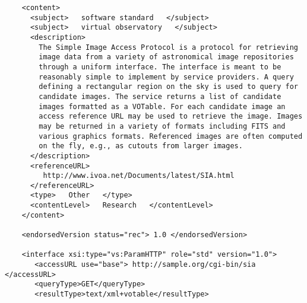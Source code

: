 \documentclass[11pt,a4paper]{ivoa}
\begin{document}
{{\begin{verbatim}
    <content>
      <subject>   software standard   </subject>
      <subject>   virtual observatory   </subject>
      <description>
        The Simple Image Access Protocol is a protocol for retrieving
        image data from a variety of astronomical image repositories
        through a uniform interface. The interface is meant to be
        reasonably simple to implement by service providers. A query
        defining a rectangular region on the sky is used to query for
        candidate images. The service returns a list of candidate
        images formatted as a VOTable. For each candidate image an
        access reference URL may be used to retrieve the image. Images
        may be returned in a variety of formats including FITS and
        various graphics formats. Referenced images are often computed
        on the fly, e.g., as cutouts from larger images. 
      </description>
      <referenceURL>
         http://www.ivoa.net/Documents/latest/SIA.html
      </referenceURL>
      <type>   Other   </type>
      <contentLevel>   Research   </contentLevel>
    </content>

    <endorsedVersion status="rec"> 1.0 </endorsedVersion>

    <interface xsi:type="vs:ParamHTTP" role="std" version="1.0">
       <accessURL use="base"> http://sample.org/cgi-bin/sia </accessURL>
       <queryType>GET</queryType>
       <resultType>text/xml+votable</resultType>


\end{verbatim}}}
\end{document}
